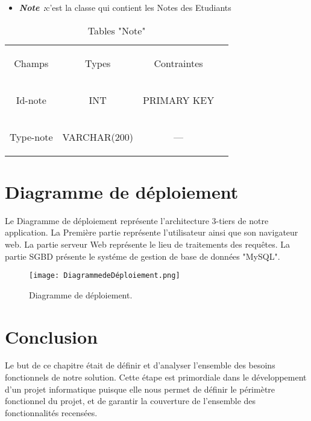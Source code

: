 \begin{table}[h]
	
	\begin{itemize}
		
		\item \textit{\textbf{ Note :}}c'est la classe qui contient les Notes des Etudiants
	\end{itemize}
	\begin{center}
		\begin{tabular}{>{\begin{bf} } c <{\end{bf}}ccc}
			
			\rowcolor{-blue!20!red}Champs & \begin{bf}Types \end{bf} & \begin{bf}Contraintes\end{bf} & \\
			
			Id-note & INT & PRIMARY KEY& \\
			Type-note & VARCHAR(200) & ---& \\
		\end{tabular}
	\end{center}
	\caption{Tables  "Note"}
	\label{mTables  "Note"}
\end{table}

\FloatBarrier

\section{Diagramme de déploiement}
Le Diagramme de déploiement représente l’architecture 3-tiers de notre application. La
Première partie représente l’utilisateur ainsi que son navigateur web. La partie serveur Web
représente le lieu de traitements des requêtes. La partie SGBD présente le systéme de gestion
de base de données "MySQL".
\begin{figure}[ht]
	\centering
	\texttt{[image: DiagrammedeDéploiement.png]}
	\caption{Diagramme de déploiement.}
	\label{fig:Diagramme de déploiement}
\end{figure}
\FloatBarrier

\section{Conclusion}
Le but de ce chapitre était de définir et d’analyser l’ensemble des besoins fonctionnels  de notre solution. Cette étape est primordiale dans le développement d’un projet informatique puisque elle nous permet de définir le périmètre fonctionnel du projet, et de garantir la couverture de l’ensemble des fonctionnalités recensées.
